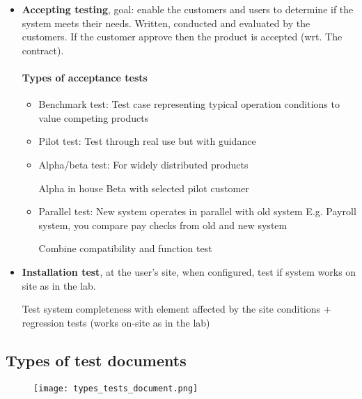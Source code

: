\begin{itemize}

    \item \textbf{Accepting testing}, goal: enable the customers and
        users to determine if the system meets their needs. Written,
        conducted and evaluated by the customers. If the customer
        approve then the product is accepted (wrt. The contract). 

        \paragraph{Types of acceptance tests}

        \begin{itemize}
            \item Benchmark test:
                Test case representing typical operation conditions to value competing products
            \item Pilot test:
                Test through real use but with guidance
            \item Alpha/beta test: For widely distributed products

                Alpha in house\newline
                Beta with selected pilot customer
            \item Parallel test:
                New system operates in parallel with old system
                E.g. Payroll system, you compare pay checks from old and new system

                Combine compatibility and function test
        \end{itemize}

    \item \textbf{Installation test}, at the user’s site, when configured, test if system works on site as in the lab.

        Test system completeness with element affected by the site
        conditions + regression tests (works on-site as in the lab)
\end{itemize}


\subsection{Types of test documents}

\begin{figure}[!ht]
    \centering
    \texttt{[image: types\_tests\_document.png]}
\end{figure}


